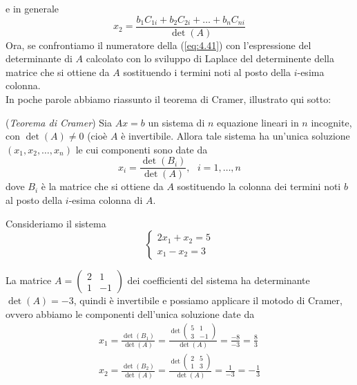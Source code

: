 e in generale
\begin{equation}
  \label{eq:4.41}
   x_2=\frac{b_1C_{1i}+b_2C_{2i}+\dots+b_nC_{ni}}{\det(A)} 
\end{equation}
Ora, se confrontiamo il numeratore della (\ref{eq:4.41}) con l'espressione del determinante di $A$ calcolato con
lo sviluppo di Laplace del determinente della matrice che si ottiene da $A$ sostituendo i termini noti al posto
della $i$-esima colonna.\\
In poche parole abbiamo riassunto il teorema di Cramer, illustrato qui sotto:
\begin{teorema}
  ({\em Teorema di Cramer}) Sia $Ax=b$ un sistema di $n$ equazione lineari in $n$ incognite, con $\det(A)\neq 0$
  (cioè $A$ è invertibile. Allora tale sistema ha un'unica soluzione $(x_1,x_2,\dots,x_n)$ le cui componenti sono
  date da
  \begin{equation*}
    x_i=\frac{\det(B_i)}{\det(A)}, \text{ } i=1,\dots,n
  \end{equation*}
  dove $B_i$ è la matrice che si ottiene da $A$ sostituendo la colonna dei termini noti $b$ al posto della
  $i$-esima colonna di $A$.
\end{teorema}
\begin{esempio}
  Consideriamo il sistema
  \begin{equation*}
    \begin{cases}
      2x_1+x_2=5\\
      x_1-x_2=3
    \end{cases}
  \end{equation*}
\end{esempio}
La matrice $A=
\begin{pmatrix}
  2 & 1\\
  1 & -1
\end{pmatrix}
$ dei coefficienti del sistema ha determinante $\det(A)=-3$, quindi è invertibile e possiamo applicare il motodo
di Cramer, ovvero abbiamo le componenti dell'unica soluzione date da
\begin{eqnarray*}
  x_1=\frac{\det(B_1)}{\det (A)}=\frac{\det
  \begin{pmatrix}
    5 & 1\\
    3 & -1
  \end{pmatrix}
  }{\det (A)}=\frac{-8}{-3}=\frac{8}{3}\\
  x_2=\frac{\det(B_2)}{\det (A)}=\frac{\det
  \begin{pmatrix}
    2 & 5\\
    1 & 3
  \end{pmatrix}
  }{\det (A)}=\frac{1}{-3}=-\frac{1}{3} 
\end{eqnarray*}
